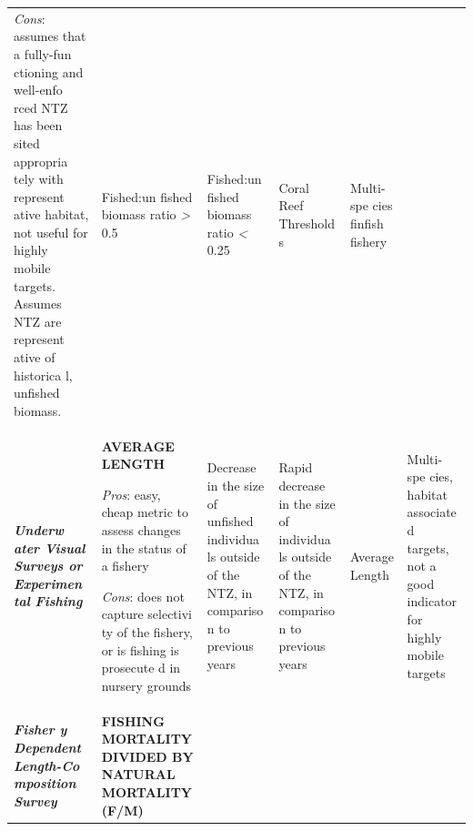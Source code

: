 \documentclass[]{book}
\begin{document}
\begin{longtable}[]{@{}llllll@{}}
\begin{minipage}[t]{0.16\columnwidth}
\emph{Cons}: assumes that a fully-fun ctioning and well-enfo rced NTZ
has been sited appropria tely with represent ative habitat, not useful
for highly mobile targets. Assumes NTZ are represent ative of historica
l, unfished biomass.\strut
\end{minipage} & \begin{minipage}[t]{0.16\columnwidth}\raggedright\strut
Fished:un fished biomass ratio \emph{\textgreater{}} 0.5\strut
\end{minipage} & \begin{minipage}[t]{0.16\columnwidth}\raggedright\strut
Fished:un fished biomass ratio \emph{\textless{}} 0.25\strut
\end{minipage} & \begin{minipage}[t]{0.16\columnwidth}\raggedright\strut
Coral Reef Threshold s\strut
\end{minipage} & \begin{minipage}[t]{0.16\columnwidth}\raggedright\strut
Multi-spe cies finfish fishery\strut
\end{minipage}\tabularnewline
\begin{minipage}[t]{0.16\columnwidth}\raggedright\strut
\emph{\textbf{Underw ater Visual Surveys or Experimen tal Fishing}
}\strut
\end{minipage} & \begin{minipage}[t]{0.16\columnwidth}\raggedright\strut
\textbf{AVERAGE LENGTH}

\emph{Pros}: easy, cheap metric to assess changes in the status of a
fishery

\emph{Cons}: does not capture selectivi ty of the fishery, or is fishing
is prosecute d in nursery grounds\strut
\end{minipage} & \begin{minipage}[t]{0.16\columnwidth}\raggedright\strut
Decrease in the size of unfished individua ls outside of the NTZ, in
compariso n to previous years\strut
\end{minipage} & \begin{minipage}[t]{0.16\columnwidth}\raggedright\strut
Rapid decrease in the size of individua ls outside of the NTZ, in
compariso n to previous years\strut
\end{minipage} & \begin{minipage}[t]{0.16\columnwidth}\raggedright\strut
Average Length\strut
\end{minipage} & \begin{minipage}[t]{0.16\columnwidth}\raggedright\strut
Multi-spe cies, habitat associate d targets, not a good indicator for
highly mobile targets\strut
\end{minipage}\tabularnewline
\begin{minipage}[t]{0.16\columnwidth}\raggedright\strut
\textbf{\emph{Fisher y Dependent Length-Co mposition Survey}}\strut
\end{minipage} & \begin{minipage}[t]{0.16\columnwidth}\raggedright\strut
\textbf{FISHING MORTALITY DIVIDED BY NATURAL MORTALITY (F/M)}


\end{minipage}
\end{longtable}
\end{document}
